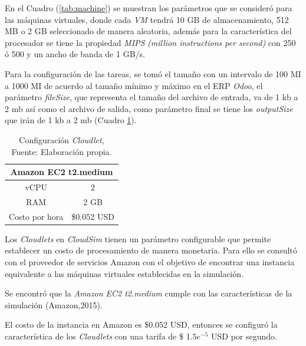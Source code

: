 \documentclass[jou,apacite]{apa6}
\begin{document}
En el Cuadro (\ref{tab:machine}) se muestran los par\'ametros que se consider\'o para las m\'aquinas virtuales, donde cada \textit{VM} tendr\'a 10 GB de almacenamiento, 512 MB  o 2 GB seleccionado de manera aleatoria, adem\'as para la caracter\'istica del procesador se tiene  la propiedad \textit{MIPS} \textit{(million instructions per second)} con 250 \'o 500 y un ancho de banda de 1 GB/s.

Para la configuraci\'on de las tareas, se tom\'o el tamaño con un intervalo de 100 MI a 1000 MI de acuerdo al tamaño mínimo y máximo en el ERP \textit{Odoo},  el par\'ametro \textit{fileSize}, que representa el tamaño del archivo de entrada, va de 1 kb a 2 mb as\'i como el archivo de salida, como par\'ametro final se tiene los \textit{outputSize} que ir\'an de 1 kb a 2 mb (Cuadro \ref{tab:cloudlet}).


\setcounter{table}{4}
\renewcommand\thetable{\arabic{table}}
\begin{table}[h!]
	\centering
	\begin{tabular}{@{}cc@{}}
		\toprule
		\multicolumn{2}{c}{{\bf Amazon EC2 t2.medium}} \\ \midrule
		vCPU     & 2     \\
		RAM &2 GB \\
		Costo por hora           & \$0.052 USD      \\ \midrule
		
	\end{tabular}
	\caption{Configuraci\'on \textit{Cloudlet}, Fuente: Elaboraci\'on propia.}
	\label{tab:cloudlet}
\end{table}

Los \textit{Cloudlets} en \textit{CloudSim} tienen un parámetro configurable que permite establecer un costo de procesamiento de manera monetaria. Para ello se consultó con el proveedor de servicios Amazon con el objetivo de  encontrar una instancia equivalente a las máquinas virtuales establecidas en la simulación. 

Se encontró que la \textit{Amazon EC2 t2.medium} cumple con las características de la simulación (Amazon,2015).

El costo de la instancia en Amazon es \$0.052 USD, entonces se configuró la característica  de los \textit{Cloudlets} con una tarifa de \$ 1.$5 e^{-5}$ USD por segundo.
\end{document}
